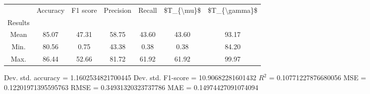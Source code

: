 \begin{tabular}{|c|c|c|c|c|c|c|}
\toprule
{} &  Accuracy &  F1 score &  Precision &  Recall &  \$T\_\{\textbackslash mu\}\$ &  \$T\_\{\textbackslash gamma\}\$ \\
Results &           &           &            &         &            &               \\
\hline
Mean    &     85.07 &     47.31 &      58.75 &   43.60 &      43.60 &         93.17 \\
Min.    &     80.56 &      0.75 &      43.38 &    0.38 &       0.38 &         84.20 \\
Max.    &     86.44 &     52.66 &      81.72 &   61.92 &      61.92 &         99.97 \\
\bottomrule
\end{tabular}

 Dev. std. accuracy = 1.1602534821700445
 Dev. std. F1-score = 10.90682281601432
 $R^2$ = 0.10771227876680056
 MSE = 0.12201971395595763
 RMSE = 0.34931320323737786
 MAE = 0.14974427091074094